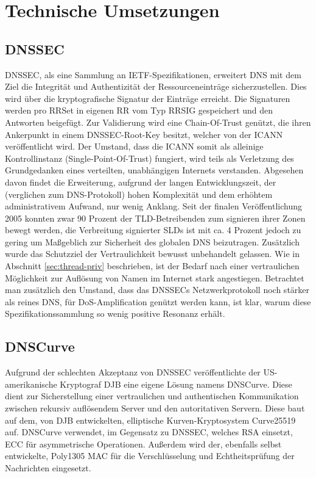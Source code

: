 \chapter{Technische Umsetzungen}
\label{chap:technologies}

\section{DNSSEC}
\label{sec:tec-dnssec}
DNSSEC, als eine Sammlung an IETF-Spezifikationen, erweitert DNS mit dem Ziel die Integrität und Authentizität der Ressourceneinträge sicherzustellen\cite{Arends2005}. Dies wird über die kryptografische Signatur der Einträge erreicht. Die Signaturen werden pro RRSet in eigenen RR vom Typ RRSIG gespeichert und den Antworten beigefügt. Zur Validierung wird eine Chain-Of-Trust genützt, die ihren Ankerpunkt in einem \ac{DNSSEC}-Root-Key besitzt, welcher von der ICANN veröffentlicht wird. Der Umstand, dass die ICANN somit als alleinige Kontrollinstanz (Single-Point-Of-Trust) fungiert, wird teils als Verletzung des Grundgedanken eines verteilten, unabhängigen Internets verstanden\cite{Finch2014}.
Abgesehen davon findet die Erweiterung, aufgrund der langen Entwicklungszeit, der (verglichen zum DNS-Protokoll) hohen Komplexität und dem erhöhtem administrativem Aufwand, nur wenig Anklang. Seit der finalen Veröffentlichung 2005 konnten zwar 90 Prozent der TLD-Betreibenden zum signieren ihrer Zonen bewegt werden, die Verbreitung signierter SLDs ist mit ca. 4 Prozent jedoch zu gering um Maßgeblich zur Sicherheit des globalen DNS beizutragen\cite{DCCommunications2018}. Zusätzlich wurde das Schutzziel der Vertraulichkeit bewusst unbehandelt gelassen. Wie in Abschnitt \ref{sec:thread-priv} beschrieben, ist der Bedarf nach einer vertraulichen Möglichkeit zur Auflösung von Namen im Internet stark angestiegen. Betrachtet man zusätzlich den Umstand, dass das \ac{DNSSEC}s Netzwerkprotokoll noch stärker als reines DNS, für \ac{DoS}-Amplification genützt werden kann, ist klar, warum diese Spezifikationssammlung so wenig positive Resonanz erhält\cite{Antic2014}.

\section{DNSCurve}
\label{sec:tec-dnscurve}
Aufgrund der schlechten Akzeptanz von \ac{DNSSEC} veröffentlichte der US-amerikanische Kryptograf \ac{DJB} eine eigene Lösung namens DNSCurve. Diese dient zur Sicherstellung einer vertraulichen und authentischen Kommunikation zwischen rekursiv auflösendem Server und den autoritativen Servern. Diese baut auf dem, von \ac{DJB} entwickelten, elliptische Kurven-Kryptosystem Curve25519 auf. DNSCurve verwendet, im Gegensatz zu \ac{DNSSEC}, welches RSA einsetzt, \ac{ECC} für asymmetrische Operationen. Außerdem wird der, ebenfalls selbst entwickelte, Poly1305 \ac{MAC} für die Verschlüsselung und Echtheitsprüfung der Nachrichten eingesetzt. 


